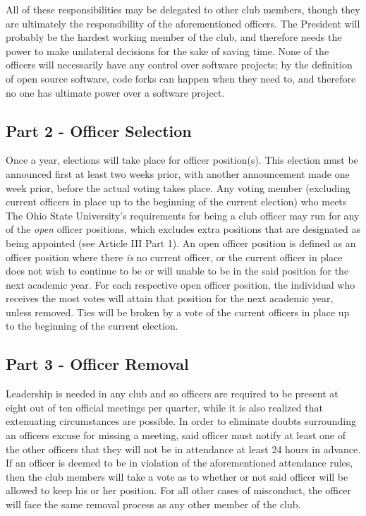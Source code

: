 \documentclass{article}
\begin{document}
	All of these responsibilities may be delegated to other club members, though they are ultimately the responsibility of the aforementioned officers.  The President will probably be the hardest working member of the club, and therefore needs the power to make unilateral decisions for the sake of saving time.  None of the officers will necessarily have any control over software projects; by the definition of open source software, code forks can happen when they need to, and therefore no one has ultimate power over a software project.

	\subsection{Part 2 - Officer Selection}

	Once a year, elections will take place for officer position(s).  This election must be announced first at least two weeks prior, with another announcement made one week prior, before the actual voting takes place.  Any voting member (excluding current officers in place up to the beginning of the current election) who meets The Ohio State University's requirements for being a club officer may run for any of the \textit{open} officer positions, which excludes extra positions that are designated as being appointed (see Article III Part 1).  An open officer position is defined as an officer position where there \textit{is} no current officer, or the current officer in place does not wish to continue to be or will unable to be in the said position for the next academic year.  For each respective open officer position, the individual who receives the most votes will attain that position for the next academic year, unless removed.  Ties will be broken by a vote of the current officers in place up to the beginning of the current election.

	\subsection{Part 3 - Officer Removal}

	Leadership is needed in any club and so officers are required to be present at eight out of ten official meetings per quarter, while it is also realized that extenuating circumstances are possible.  In order to eliminate doubts surrounding an officers excuse for missing a meeting, said officer must notify at least one of the other officers that they will not be in attendance at least 24 hours in advance.  If an officer is deemed to be in violation of the aforementioned attendance rules, then the club members will take a vote as to whether or not said officer will be allowed to keep his or her position. For all other cases of misconduct, the officer will face the same removal process as any other member of the club.
\end{document}
